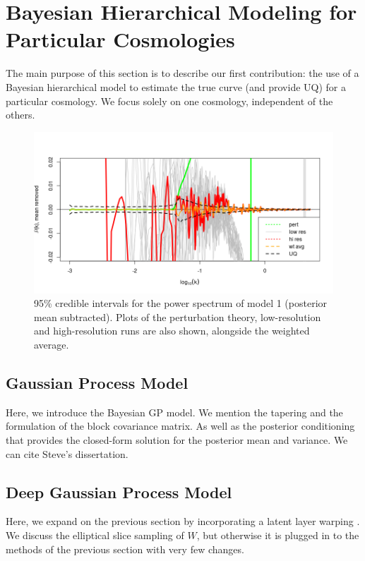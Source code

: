 \documentclass[11pt]{article}
\begin{document}
\section{Bayesian Hierarchical Modeling for Particular Cosmologies}
\label{sec:hm_fit}

The main purpose of this section is to describe our first contribution: the use of a Bayesian hierarchical model to estimate the true curve (and provide UQ) for a particular cosmology.  We focus solely on one cosmology, independent of the others.

\begin{figure}[ht]
    \centering
    \includegraphics[width=6in]{plot_fit.png}
    \caption{95\% credible intervals for the power spectrum of model 1 (posterior mean subtracted). Plots of the perturbation theory, low-resolution and high-resolution runs are also shown, alongside the weighted average.}
    \label{fig:plot_data}
\end{figure}

\subsection{Gaussian Process Model}

Here, we introduce the Bayesian GP model.  We mention the tapering and the formulation of the block covariance matrix.  As well as the posterior conditioning that provides the closed-form solution for the posterior mean and variance.  We can cite Steve's dissertation.

\subsection{Deep Gaussian Process Model}

Here, we expand on the previous section by incorporating a latent layer warping \citep{damianou2013deep}.  We discuss the elliptical slice sampling of $W$, but otherwise it is plugged in to the methods of the previous section with very few changes.
\end{document}

